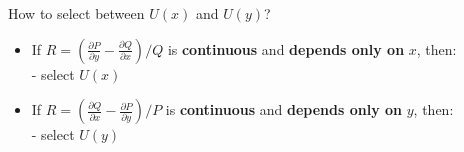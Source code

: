 How to select between $U(x)$ and $U(y)$?
\begin{itemize}
\item If $R=(\frac{\partial P}{\partial y}-\frac{\partial Q}{\partial x})/Q$ is \textbf{continuous} and  \textbf{depends only on} $x$, then: \\{\large - select $U(x)$}
\item If $R=(\frac{\partial Q}{\partial x}-\frac{\partial P}{\partial y})/P$ is \textbf{continuous} and \textbf{depends only on} $y$, then: \\{\large - select $U(y)$}
\end{itemize}



\updateinfo[September 25, 2018]